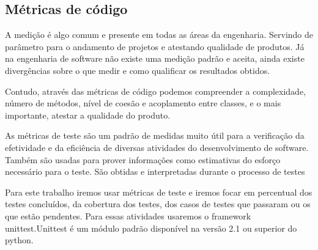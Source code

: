 
\subsection{Métricas de código}
\label{Sec:Métricas de código}
  A medição é algo comum e presente em todas as áreas da engenharia. Servindo 
de parâmetro para o andamento de projetos e atestando qualidade de produtos. Já
na engenharia de software não existe uma medição padrão e aceita, ainda existe
divergências sobre o que medir e como qualificar os resultados obtidos.
  
  Contudo, através das métricas de código podemos compreender a complexidade, 
número de métodos, nível de coesão e acoplamento entre classes, e o mais 
importante, atestar a qualidade do produto. 

  As métricas de teste são um padrão de medidas muito útil para a verificação
da efetividade e da eficiência de diversas atividades do desenvolvimento de 
software. Também são usadas para prover informações como estimativas do esforço
necessário para o teste. São obtidas e interpretadas durante o processo de 
testes \cite{bradshaw}
  
 Para este trabalho iremos usar métricas de teste e iremos focar em percentual
dos testes concluídos, da cobertura dos testes, dos casos de testes que 
passaram ou os que estão pendentes. Para essas atividades usaremos o framework 
unittest.Unittest é um módulo padrão disponível na versão 2.1 ou superior do python.




